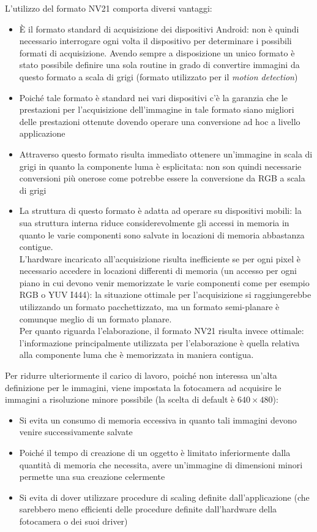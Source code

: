 L'utilizzo del formato NV21 comporta diversi vantaggi:
\begin{itemize}
  \item \`E il formato standard di acquisizione dei dispositivi Android: non è quindi necessario interrogare ogni volta il dispositivo per determinare i possibili formati di acquisizione. Avendo sempre a disposizione un unico formato è stato possibile definire una sola routine in grado di convertire immagini da questo formato a scala di grigi (formato utilizzato per il \textit{motion detection})
  \item Poiché tale formato è standard nei vari dispositivi c'è la garanzia che le prestazioni per l'acquisizione dell'immagine in tale formato siano migliori delle prestazioni ottenute dovendo operare una conversione ad hoc a livello applicazione
  \item Attraverso questo formato risulta immediato ottenere un'immagine in scala di grigi in quanto la componente luma è esplicitata: non son quindi necessarie conversioni più onerose come potrebbe essere la conversione da RGB a scala di grigi
  \item La struttura di questo formato è adatta ad operare su dispositivi mobili: la sua struttura interna riduce considerevolmente gli accessi in memoria in quanto le varie componenti sono salvate in locazioni di memoria abbastanza contigue.\\
  L'hardware incaricato all'acquisizione risulta inefficiente se per ogni pixel è necessario accedere in locazioni differenti di memoria (un accesso per ogni piano in cui devono venir memorizzate le varie componenti come per esempio RGB o YUV I444): la situazione ottimale per l'acquisizione si raggiungerebbe utilizzando un formato pacchettizzato, ma un formato semi-planare è comunque meglio di un formato planare.\\
  Per quanto riguarda l'elaborazione, il formato NV21 risulta invece ottimale: l'informazione principalmente utilizzata per l'elaborazione è quella relativa alla componente luma che è memorizzata in maniera contigua.
\end{itemize}

Per ridurre ulteriormente il carico di lavoro, poiché non interessa un'alta definizione per le immagini, viene impostata la fotocamera ad acquisire le immagini a risoluzione minore possibile (la scelta di default è $640×480$):
\begin{itemize}
  \item Si evita un consumo di memoria eccessiva in quanto tali immagini devono venire successivamente salvate
  \item Poiché il tempo di creazione di un oggetto è limitato inferiormente dalla quantità di memoria che necessita, avere un'immagine di dimensioni minori permette una sua creazione celermente
  \item Si evita di dover utilizzare procedure di scaling definite dall'applicazione (che sarebbero meno efficienti delle procedure definite dall'hardware della fotocamera o dei suoi driver)
\end{itemize}

